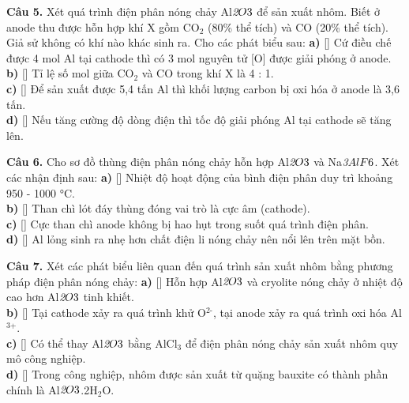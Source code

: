 \documentclass{article}
\begin{document}
\fontsize{22}{29}\selectfont
\textbf{Câu 5.} Xét quá trình điện phân nóng chảy Al$\textit{{\text{2}}$O$}{\text{3}}$ để sản xuất nhôm. Biết ở anode thu được hỗn hợp khí X gồm CO$_{\text{2}}$ (80\% thể tích) và CO (20\% thể tích). Giả sử không có khí nào khác sinh ra. Cho các phát biểu sau:
\vspace{6pt}
\textbf{a)} [\quad] Cứ điều chế được 4 mol Al tại cathode thì có 3 mol nguyên tử [O] được giải phóng ở anode.\\[4pt]
\textbf{b)} [\quad] Tỉ lệ số mol giữa CO$_{\text{2}}$ và CO trong khí X là 4 : 1.\\[4pt]
\textbf{c)} [\quad] Để sản xuất được 5,4 tấn Al thì khối lượng carbon bị oxi hóa ở anode là 3,6 tấn.\\[4pt]
\textbf{d)} [\quad] Nếu tăng cường độ dòng điện thì tốc độ giải phóng Al tại cathode sẽ tăng lên.\\[4pt]
\vspace*{\fill}
\newpage

\fontsize{22}{29}\selectfont
\textbf{Câu 6.} Cho sơ đồ thùng điện phân nóng chảy hỗn hợp Al$\textit{{\text{2}}$O$}{\text{3}}$ và Na$\textit{{\text{3}}$AlF$}{\text{6}}$. Xét các nhận định sau:
\vspace{6pt}
\textbf{a)} [\quad] Nhiệt độ hoạt động của bình điện phân duy trì khoảng 950 - 1000 °C.\\[4pt]
\textbf{b)} [\quad] Than chì lót đáy thùng đóng vai trò là cực âm (cathode).\\[4pt]
\textbf{c)} [\quad] Cực than chì anode không bị hao hụt trong suốt quá trình điện phân.\\[4pt]
\textbf{d)} [\quad] Al lỏng sinh ra nhẹ hơn chất điện li nóng chảy nên nổi lên trên mặt bồn.\\[4pt]
\vspace*{\fill}
\newpage

\fontsize{22}{29}\selectfont
\textbf{Câu 7.} Xét các phát biểu liên quan đến quá trình sản xuất nhôm bằng phương pháp điện phân nóng chảy:
\vspace{6pt}
\textbf{a)} [\quad] Hỗn hợp Al$\textit{{\text{2}}$O$}{\text{3}}$ và cryolite nóng chảy ở nhiệt độ cao hơn Al$\textit{{\text{2}}$O$}{\text{3}}$ tinh khiết.\\[4pt]
\textbf{b)} [\quad] Tại cathode xảy ra quá trình khử O$^{\text{2-}}$, tại anode xảy ra quá trình oxi hóa Al$^{\text{3+}}$.\\[4pt]
\textbf{c)} [\quad] Có thể thay Al$\textit{{\text{2}}$O$}{\text{3}}$ bằng AlCl$_{\text{3}}$ để điện phân nóng chảy sản xuất nhôm quy mô công nghiệp.\\[4pt]
\textbf{d)} [\quad] Trong công nghiệp, nhôm được sản xuất từ quặng bauxite có thành phần chính là Al$\textit{{\text{2}}$O$}{\text{3}}$.2H$_{\text{2}}$O.\\[4pt]
\vspace*{\fill}
\newpage
\end{document}
